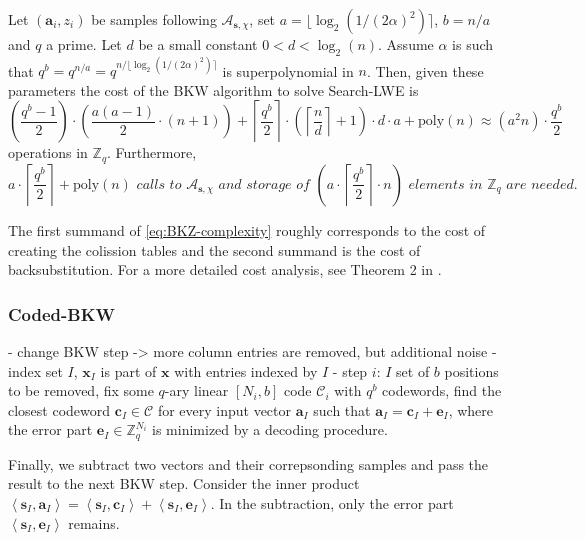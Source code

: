 \begin{theorem}
  Let $(\mathbf{a}_i, z_i)$ be samples following $\mathcal{A}_{\mathbf{s}, \chi}$, set $a = \lfloor \log_2(1/(2\alpha)^2)\rceil$, $b = n/a$ and $q$ a prime. Let $d$ be a small constant $0 < d < \log_2(n)$. Assume $\alpha$ is such that $q^b = q^{n/a} = q^{n/\lfloor \log_2(1/(2\alpha)^2)\rceil}$ is superpolynomial in $n$. Then, given these parameters the cost of the BKW algorithm to solve Search-LWE is
  \begin{equation}\label{eq:BKZ-complexity}
    \left(\frac{q^b-1}{2}\right) \cdot \left(\frac{a(a-1)}{2} \cdot (n + 1) \right) + \left\lceil\frac{q^b}{2}\right\rceil \cdot \left(\left\lceil\frac{n}{d}\right\rceil + 1\right) \cdot d \cdot a + \text{poly}(n) \approx (a^2 n) \cdot \frac{q^b}{2}
  \end{equation}
  operations in $\mathbb{Z}_q$. Furthermore,
  \begin{equation}
    a \cdot \left\lceil\frac{q^b}{2}\right\rceil + \text{poly}(n)\textit{ calls to } \mathcal{A}_{\mathbf{s}, \chi}\textit{ and storage of }  \left(a \cdot \left\lceil\frac{q^b}{2}\right\rceil \cdot n\right) \textit{ elements in } \mathbb{Z}_q \textit{ are needed.}
  \end{equation}
\end{theorem}

The first summand of \cref{eq:BKZ-complexity} roughly corresponds to the cost of creating the colission tables and the second summand is the cost of backsubstitution. For a more detailed cost analysis, see Theorem 2 in \cite{ACFFP15a}.


\subsubsection*{Coded-BKW \cite{GJS15}}
- change BKW step -> more column entries are removed, but additional noise
- index set $I$, $\mathbf{x}_I$ is part of $\mathbf{x}$ with entries indexed by $I$
- step $i$: $I$ set of $b$ positions to be removed, fix some $q$-ary linear $\left[N_i, b\right]$ code $\mathcal{C}_i$ with $q^b$ codewords, find the closest codeword $\mathbf{c}_I \in \mathcal{C}$ for every input vector $\mathbf{a}_I$ such that $\mathbf{a}_I = \mathbf{c}_I + \mathbf{e}_I$, where the error part $\mathbf{e}_I \in \mathbb{Z}_q^{N_i}$ is minimized by a decoding procedure.

Finally, we subtract two vectors and their correpsonding samples and pass the result to the next BKW step. Consider the inner product$\left\langle \mathbf{s}_{I}, \mathbf{a}_{I} \right\rangle = \left\langle \mathbf{s}_{I}, \mathbf{c}_{I} \right\rangle + \left\langle \mathbf{s}_{I}, \mathbf{e}_{I} \right\rangle$. In the subtraction, only the error part $\left\langle \mathbf{s}_{I}, \mathbf{e}_{I} \right\rangle$ remains.

